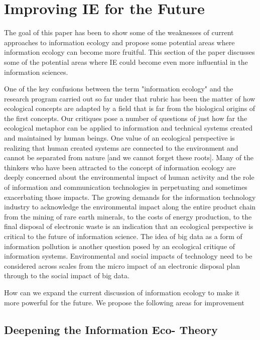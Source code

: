 \section{Improving IE for the Future}

The goal of this paper has been to show some of the weaknesses of current approaches to information ecology and propose some potential areas where information ecology can become more fruitful. This section of the paper discusses some of the potential areas where IE could become even more influential in the information sciences.

One of the key confusions between the term "information ecology" and the research program carried out so far under that rubric has been the matter of how ecological concepts are adapted by a field that is far from the biological origins of the first concepts. Our critiques pose a number of questions of just how far the ecological metaphor can be applied to information and technical systems created and maintained by human beings. One value of an ecological perspective is realizing that human created systems are connected to the environment and cannot be separated from nature [and we cannot forget these roots]. Many of the thinkers who have been attracted to the concept of information ecology are deeply concerned about the environmental impact of human activity and the role of information and communication technologies in perpetuating and sometimes exacerbating those impacts. The growing demands for the information technology industry to acknowledge the environmental impact along the entire product chain from the mining of rare earth minerals, to the costs of energy production, to the final disposal of electronic waste is an indication that an ecological perspective is critical to the future of information science. The idea of big data as a form of information pollution is another question posed by an ecological critique of information systems. Environmental and social impacts of technology need to be considered across scales from the micro impact of an electronic disposal plan through to the social impact of big data.

How can we expand the current discussion of information ecology to make it more powerful for the future. We propose the following areas for improvement

\subsection{Deepening the Information Eco- Theory}

